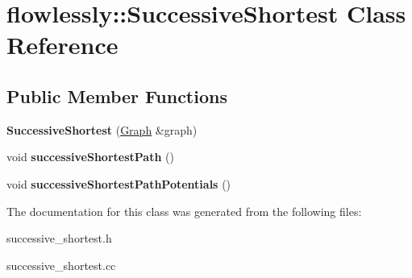 \hypertarget{classflowlessly_1_1SuccessiveShortest}{\section{flowlessly\-:\-:\-Successive\-Shortest \-Class \-Reference}
\label{classflowlessly_1_1SuccessiveShortest}
}
\subsection*{\-Public \-Member \-Functions}
\begin{DoxyCompactItemize}
\item 
\hypertarget{classflowlessly_1_1SuccessiveShortest_a59b6cdb1a341da3589dc43f3e9d22397}{{\bfseries \-Successive\-Shortest} (\hyperlink{classflowlessly_1_1Graph}{\-Graph} \&graph)}\label{classflowlessly_1_1SuccessiveShortest_a59b6cdb1a341da3589dc43f3e9d22397}

\item 
\hypertarget{classflowlessly_1_1SuccessiveShortest_a4d81fd9df78f1b028cd5c1ba69d64bad}{void {\bfseries successive\-Shortest\-Path} ()}\label{classflowlessly_1_1SuccessiveShortest_a4d81fd9df78f1b028cd5c1ba69d64bad}

\item 
\hypertarget{classflowlessly_1_1SuccessiveShortest_a72727023355580f6a863df381bcbbe90}{void {\bfseries successive\-Shortest\-Path\-Potentials} ()}\label{classflowlessly_1_1SuccessiveShortest_a72727023355580f6a863df381bcbbe90}

\end{DoxyCompactItemize}


\-The documentation for this class was generated from the following files\-:\begin{DoxyCompactItemize}
\item 
successive\-\_\-shortest.\-h\item 
successive\-\_\-shortest.\-cc\end{DoxyCompactItemize}
